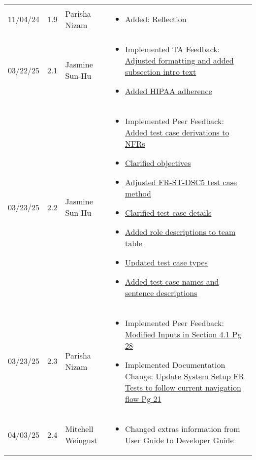 \documentclass[12pt, titlepage]{article}
\begin{document}
\begin{longtable}{p{2cm}p{1cm}p{4cm}p{8cm}}
11/04/24 & 1.9 & Parisha Nizam &
\begin{itemize}[noitemsep, topsep=0pt]
  \item Added: Reflection
\end{itemize} \\

03/22/25 & 2.1 & Jasmine Sun-Hu &
\begin{itemize}[noitemsep, topsep=0pt]
  \item Implemented TA Feedback: \href{https://github.com/parishanizam/TeleHealth/issues/292}{Adjusted formatting and added subsection intro text}
  \item \href{https://github.com/parishanizam/TeleHealth/issues/293}{Added HIPAA adherence}
\end{itemize} \\

03/23/25 & 2.2 & Jasmine Sun-Hu &
\begin{itemize}[noitemsep, topsep=0pt]
  \item Implemented Peer Feedback: \href{https://github.com/parishanizam/TeleHealth/issues/224}{Added test case derivations to NFRs}
  \item \href{https://github.com/parishanizam/TeleHealth/issues/223}{Clarified objectives}
  \item \href{https://github.com/parishanizam/TeleHealth/issues/222}{Adjusted FR-ST-DSC5 test case method}
  \item \href{https://github.com/parishanizam/TeleHealth/issues/221}{Clarified test case details}
  \item \href{https://github.com/parishanizam/TeleHealth/issues/206}{Added role descriptions to team table}
  \item \href{https://github.com/parishanizam/TeleHealth/issues/205}{Updated test case types}
  \item \href{https://github.com/parishanizam/TeleHealth/issues/204}{Added test case names and sentence descriptions}
\end{itemize} \\

03/23/25 & 2.3 & Parisha Nizam &
\begin{itemize}[noitemsep, topsep=0pt]
  \item Implemented Peer Feedback: \href{https://github.com/parishanizam/TeleHealth/issues/534}{Modified Inputs in Section 4.1 Pg 28}
  \item Implemented Documentation Change: \href{https://github.com/parishanizam/TeleHealth/issues/496}{Update System Setup FR Tests to follow current navigation flow Pg 21}
\end{itemize} \\

04/03/25 & 2.4 & Mitchell Weingust &
\begin{itemize}[noitemsep, topsep=0pt]
  \item Changed extras information from User Guide to Developer Guide
\end{itemize} \\

\bottomrule
\end{longtable}
\end{document}
